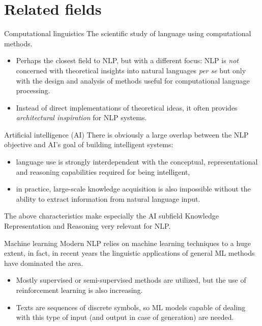 \documentclass[style=upen, size=14pt]{powerdot}
\newcommand{\gold}{\color{arany}}
\begin{document}
\section{Related fields}

\begin{slide}[toc=CompLing]{Computational linguistics}
  The scientific study of language using computational methods.\pause
  \begin{itemize}
  \item Perhaps the closest field to NLP, but with a different focus: NLP is
    \emph{not} concerned with theoretical insights into natural languages
    \emph{per se} but only with the design and analysis of methods useful for
    computational language processing.\pause
  \item Instead of direct implementations of theoretical ideas, it often provides
    \emph{architectural inspiration} for NLP systems.
  \end{itemize}
\end{slide}

\begin{slide}[toc=AI]{Artificial intelligence (AI)}
  There is obviously a large overlap between the NLP objective and AI's goal of
  building intelligent systems:\pause
    \begin{itemize}
    \item language use is strongly interdependent with the conceptual,
      representational and reasoning capabilities required for being
      intelligent,\pause
    \item in practice, large-scale knowledge acquisition is also impossible without the
      ability to extract information from natural language input.
    \end{itemize}\pause
    The above characteristics make especially the AI subfield {\gold 
      Knowledge Representation and Reasoning} very relevant for NLP.
\end{slide}

\begin{slide}[toc=Machine learning]{Machine learning}
  Modern NLP relies on machine learning techniques to a huge extent, in fact, in
  recent years the linguistic applications of general ML methods have dominated
  the area.\pause
  \begin{itemize}
  \item Mostly supervised or semi-supervised methods are utilized, but the use
    of reinforcement learning is also increasing.\pause
  \item Texts are sequences of discrete symbols, so ML models capable of dealing
    with this type of input (and output in case of generation) are needed.
  \end{itemize}
\end{slide}
\end{document}
